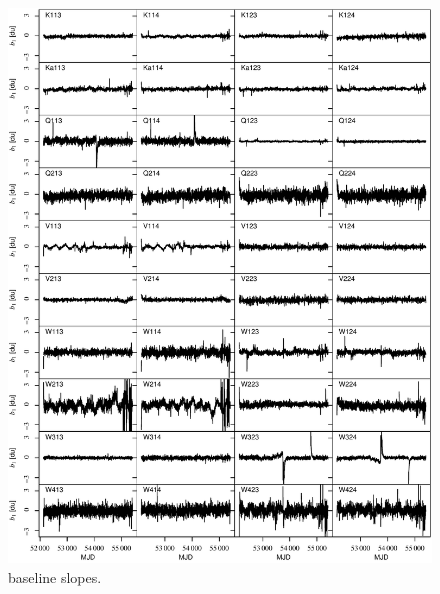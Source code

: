 \documentclass[twocolumn]{../../common/aa}
\begin{document}
\begin{figure}[p]
  	\centering
	\includegraphics[width=\textwidth]{figures/instpar_CG_baseslope_v1.pdf}
	\caption{baseline slopes.}
	\label{fig:baseslope}
\end{figure}
\end{document}
